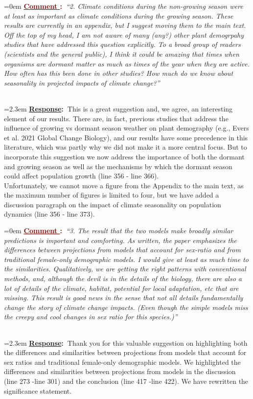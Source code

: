 \documentclass[12pt]{article}
\newcounter{cN}
\newcommand{\comment}[1]{
	\vspace{2em}
	\refstepcounter{cN} %
	\noindent \hangindent=0em \textbf{\textcolor{Maroon}{\uline{Comment \thecN}:~}}\emph{``#1''}
	}
\newcommand{\response}[1]{
	\\[0.25em]
	\hangindent=2.3em \textbf{\textcolor{NavyBlue}{\uline{Response}:~}}#1
	}
\begin{document}
\comment{2. Climate conditions during the non-growing season were at least as important as climate conditions during the growing season. These results are currently in an appendix, but I suggest moving them to the main text. Off the top of my head, I am not aware of many (any?) other plant demogrpahy studies that have addressed this question explicitly. To a broad group of readers (scientists and the general public), I think it could be amazing that times when organisms are dormant matter as much as times of the year when they are active. How often has this been done in other studies? How much do we know about seasonality in projected impacts of climate change?}
\response{This is a great suggestion and, we agree, an interesting element of our results. There are, in fact, previous studies that address the influence of growing vs dormant season weather on plant demography (e.g., Evers et al. 2021 Global Change Biology), and our results have some precedence in this literature, which was partly why we did not make it a more central focus. 
But to incorporate this suggestion we now address the importance of both the dormant and growing season as well as the mechanisms by which the dormant season could affect population growth (line 356 - line 366). 
\\
Unfortunately, we cannot move a figure from the Appendix to the main text, as the maximum number of figures is limited to four, but we have added a discussion paragraph on the impact of climate seasonality on population dynamics (line 356 - line 373).}

\comment{3. The result that the two models make broadly similar predictions is important and comforting. As written, the paper emphasizes the differences between projections from models that account for sex-ratio and from traditional female-only demographic models. I would give at least as much time to the similarities. Qualitatively, we are getting the right patterns with conventional methods, and, although the devil is in the details of the biology, there are also a lot of details of the climate, habitat, potential for local adaptation, etc that are missing. This result is good news in the sense that not all details fundamentally change the story of climate change impacts. (Even though the simple models miss the creepy and cool changes in sex ratio for this species.)}
\response{Thank you for this valuable suggestion on highlighting both the differences and similarities between projections from models that account for sex ratios and traditional female-only demographic models. 
We highlighted the differences and similarities between projections from models in the discussion (line 273 -line 301) and the conclusion  (line 417 -line 422). We have rewritten the significance statement.}
\end{document}
